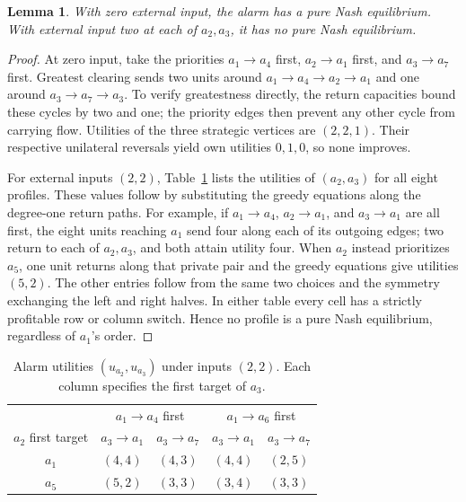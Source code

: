 \documentclass[11pt]{article}
\newtheorem{lemma}[theorem]{Lemma}
\begin{document}
\begin{lemma}\label{lem:alarm}
With zero external input, the alarm has a pure Nash equilibrium. With external input two at each of $a_2,a_3$, it has no pure Nash equilibrium.
\end{lemma}
\begin{proof}
At zero input, take the priorities $a_1\to a_4$ first, $a_2\to a_1$ first, and $a_3\to a_7$ first. Greatest clearing sends two units around $a_1\to a_4\to a_2\to a_1$ and one around $a_3\to a_7\to a_3$. To verify greatestness directly, the return capacities bound these cycles by two and one; the priority edges then prevent any other cycle from carrying flow. Utilities of the three strategic vertices are $(2,2,1)$. Their respective unilateral reversals yield own utilities $0,1,0$, so none improves.

For external inputs $(2,2)$, Table~\ref{tab:payoffs} lists the utilities of $(a_2,a_3)$ for all eight profiles. These values follow by substituting the greedy equations along the degree-one return paths. For example, if $a_1\to a_4$, $a_2\to a_1$, and $a_3\to a_1$ are all first, the eight units reaching $a_1$ send four along each of its outgoing edges; two return to each of $a_2,a_3$, and both attain utility four. When $a_2$ instead prioritizes $a_5$, one unit returns along that private pair and the greedy equations give utilities $(5,2)$. The other entries follow from the same two choices and the symmetry exchanging the left and right halves. In either table every cell has a strictly profitable row or column switch. Hence no profile is a pure Nash equilibrium, regardless of $a_1$'s order.
\end{proof}

\begin{table}[ht]
\centering
\begin{tabular}{ccccc}
\toprule
&\multicolumn{2}{c}{$a_1\to a_4$ first}&\multicolumn{2}{c}{$a_1\to a_6$ first}\\
$a_2$ first target&$a_3\to a_1$&$a_3\to a_7$&$a_3\to a_1$&$a_3\to a_7$\\\midrule
$a_1$&$(4,4)$&$(4,3)$&$(4,4)$&$(2,5)$\\
$a_5$&$(5,2)$&$(3,3)$&$(3,4)$&$(3,3)$\\\bottomrule
\end{tabular}
\caption{Alarm utilities $(u_{a_2},u_{a_3})$ under inputs $(2,2)$. Each column specifies the first target of $a_3$.}\label{tab:payoffs}
\end{table}
\end{document}
